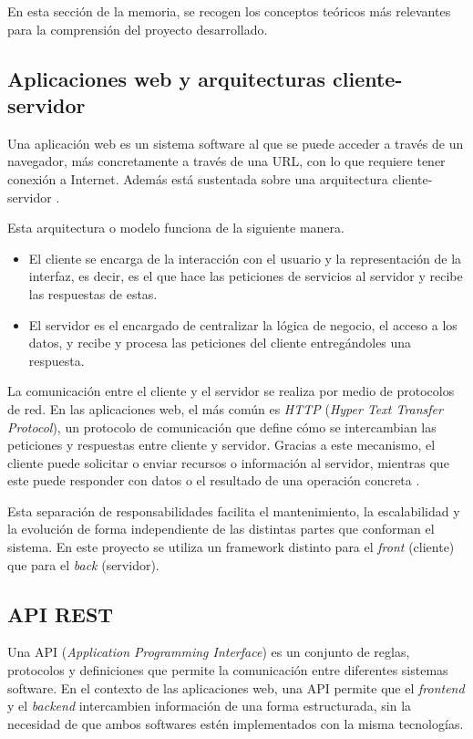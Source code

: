 
En esta sección de la memoria, se recogen los conceptos teóricos más relevantes para la comprensión del proyecto desarrollado.

\subsection{Aplicaciones web y arquitecturas cliente-servidor}

Una aplicación web es un sistema software al que se puede acceder a través de un navegador, más concretamente a través de una URL, con lo que requiere tener conexión a Internet. Además está sustentada sobre una arquitectura cliente-servidor \cite{clienteservidor:Fernan}.

Esta arquitectura o modelo funciona de la siguiente manera.
\begin{itemize}
	\item El cliente se encarga de la interacción con el usuario y la representación de la interfaz, es decir, es el que hace las peticiones de servicios al servidor y recibe las respuestas de estas.
	\item El servidor es el encargado de centralizar la lógica de negocio, el acceso a los datos, y recibe y procesa las peticiones del cliente entregándoles una respuesta.
\end{itemize}

La comunicación entre el cliente y el servidor se realiza por medio de protocolos de red. En las aplicaciones web, el más común es \textit{HTTP} (\textit{Hyper Text Transfer Protocol}), un protocolo de comunicación que define cómo se intercambian las peticiones y respuestas entre cliente y servidor. Gracias a este mecanismo, el cliente puede solicitar o enviar recursos o información al servidor, mientras que este puede responder con datos o el resultado de una operación concreta \cite{clienteservidor:Fernan}.

Esta separación de responsabilidades facilita el mantenimiento, la escalabilidad y la evolución de forma independiente de las distintas partes que conforman el sistema. En este proyecto se utiliza un framework distinto para el \textit{front} (cliente) que para el \textit{back} (servidor).

\subsection{API REST}

Una API (\textit{Application Programming Interface}) es un conjunto de reglas, protocolos y definiciones que permite la comunicación entre diferentes sistemas software. En el contexto de las aplicaciones web, una API permite que el \textit{frontend} y el \textit{backend} intercambien información de una forma estructurada, sin la necesidad de que ambos softwares estén implementados con la misma tecnologías.

